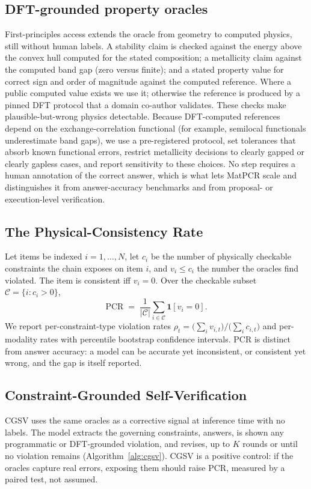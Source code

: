 \documentclass[pdflatex,sn-nature]{sn-jnl}
\begin{document}
\subsection*{DFT-grounded property oracles}
First-principles access extends the oracle from geometry to computed physics, still
without human labels. A stability claim is checked against the energy above the
convex hull computed for the stated composition; a metallicity claim against the
computed band gap (zero versus finite); and a stated property value for correct sign
and order of magnitude against the computed reference. Where a public computed value
exists we use it; otherwise the reference is produced by a pinned DFT protocol that a
domain co-author validates. These checks make plausible-but-wrong physics detectable. Because DFT-computed
references depend on the exchange-correlation functional (for example, semilocal
functionals underestimate band gaps), we use a pre-registered protocol, set tolerances
that absorb known functional errors, restrict metallicity decisions to clearly gapped
or clearly gapless cases, and report sensitivity to these choices.
No step requires a human annotation of the correct answer, which is what lets MatPCR
scale and distinguishes it from answer-accuracy benchmarks and from proposal- or
execution-level verification.

\subsection*{The Physical-Consistency Rate}
Let items be indexed $i=1,\dots,N$, let $c_i$ be the number of physically checkable
constraints the chain exposes on item $i$, and $v_i \le c_i$ the number the oracles
find violated. The item is consistent iff $v_i=0$. Over the checkable subset
$\mathcal{C}=\{i:c_i>0\}$,
\begin{equation}
\mathrm{PCR} \;=\; \frac{1}{|\mathcal{C}|}\sum_{i\in\mathcal{C}} \mathbf{1}[v_i = 0].
\end{equation}
We report per-constraint-type violation rates
$\rho_t=\big(\sum_i v_{i,t}\big)/\big(\sum_i c_{i,t}\big)$ and per-modality rates with
percentile bootstrap confidence intervals. PCR is distinct from answer accuracy: a
model can be accurate yet inconsistent, or consistent yet wrong, and the gap is
itself reported.

\subsection*{Constraint-Grounded Self-Verification}
CGSV uses the same oracles as a corrective signal at inference time with no labels.
The model extracts the governing constraints, answers, is shown any programmatic or
DFT-grounded violation, and revises, up to $K$ rounds or until no violation remains
(Algorithm~\ref{alg:cgsv}). CGSV is a positive control: if the oracles capture real
errors, exposing them should raise PCR, measured by a paired test, not assumed.
\end{document}
